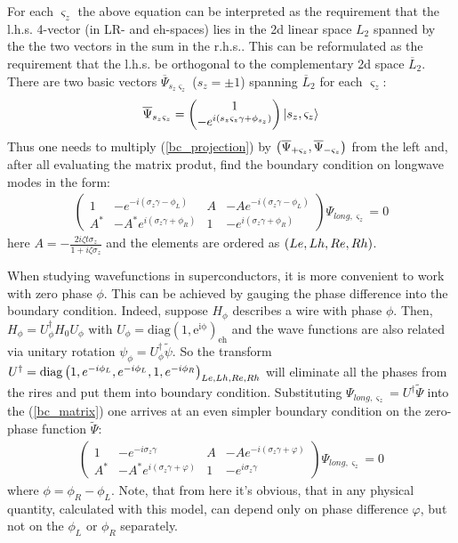 For each $ \varsigma_z $ the above equation can be interpreted as the requirement that the l.h.s. 4-vector (in LR- and eh-spaces) lies in the 2d linear space $ L_{2} $ spanned by the the two vectors in the sum in the r.h.s.. This can be reformulated as the requirement that the l.h.s. be orthogonal to the complementary 2d space $ \overline{L}_{2} $. There are two basic vectors $ \overline{\Psi}_{s_z\varsigma_{z}} $ ($ s_z=\pm1 $) spanning $ \overline{L}_{2} $ for each $ \varsigma_z $:
\begin{gather}
	\overline{\Psi}_{s_z\varsigma_{z}}
	=
	\begin{pmatrix}
	1 \\
	-e^{
		i\left(
			s_z\varsigma_z\gamma
			+
			\phi_{s_z}
			\right)
		}
	\end{pmatrix}
	\ket{s_z,\varsigma_z}
\end{gather}
Thus one needs to multiply (\ref{bc_projection}) by $ \left(\overline{\Psi}_{+\varsigma_{z}},\overline{\Psi}_{-\varsigma_{z}}\right) $ from the left and, after all evaluating the matrix produt, find the boundary condition on longwave modes in the form:
\begin{gather}
\label{bc_matrix}
\begin{pmatrix}1 & -e^{-i\left(\sigma_{z}\gamma-\phi_L\right)} & A & -Ae^{-i\left(\sigma_{z}\gamma-\phi_L\right)}\\
A^{*} & -A^{*}e^{i\left(\sigma_{z}\gamma+\phi_R\right)} & 1 & -e^{i\left(\sigma_{z}\gamma+\phi_R\right)}
\end{pmatrix}\Psi_{long, \varsigma_{z}}=0
\end{gather}
here $ A=-\frac{2i\zeta t\sigma_z}{1+i\zeta\sigma_z} $ and the elements are ordered as $ \left(Le,Lh,Re,Rh\right) $.

When studying wavefunctions in superconductors, it is more convenient to work with zero phase $ \phi $. This can be achieved by gauging the phase difference into the boundary condition. Indeed, suppose $ H_{\phi} $ describes a wire with phase $ \phi $. Then, $ H_{\phi}=U_{\phi}^{\dagger}H_{0}U_{\phi} $ with $ U_{\phi}=\mathrm{diag(1,e^{i\phi})_{eh}} $ and the wave functions are also related via unitary rotation $ \psi_{\phi}=U_{\phi}^{\dagger}\tilde{\psi} $. So the transform $ U^{\dagger}=\mathrm{diag}\left(1,e^{-i\phi_L},e^{-i\phi_L},1,e^{-i\phi_R }\right)_{Le,Lh,Re,Rh}$  will eliminate all the phases from the rires and put them into boundary condition. Substituting $ \Psi_{long,\varsigma_{z}}=U^{\dagger}\tilde{\Psi} $ into the (\ref{bc_matrix}) one arrives at an even simpler boundary condition on the zero-phase function $ \tilde{\Psi} $:
\begin{gather}
\label{bc_matrix_phases}
\begin{pmatrix}1 & -e^{-i\sigma_{z}\gamma} & A & -Ae^{-i\left(\sigma_{z}\gamma+\varphi\right)}\\
A^{*} & -A^{*}e^{i\left(\sigma_{z}\gamma+\varphi\right)} & 1 & -e^{i\sigma_{z}\gamma}
\end{pmatrix}\Psi_{long, \varsigma_{z}}=0
\end{gather}
where $ \phi=\phi_R-\phi_L $. Note, that from here it's obvious, that in any physical quantity, calculated with this model, can depend only on phase difference $ \varphi $,  but not on the $ \phi_L $ or $ \phi_R $ separately.